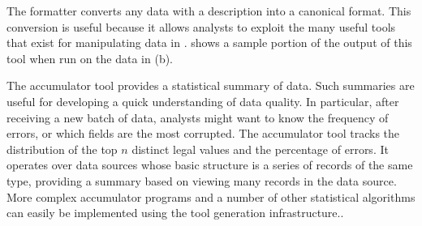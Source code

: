 The \xml{} formatter converts any data with a \padsml{} description into a canonical \xml{} format.  This conversion is useful because it allows analysts to exploit the many useful tools that exist for manipulating data in \xml{}.   shows a sample portion of the output of this tool when run on the \dibbler{} data in (b).  

The accumulator tool provides a statistical summary of data.
Such summaries are useful for developing a quick understanding of data quality.  In particular, after receiving a new batch of data, analysts might want to know the frequency of errors, or which fields are the most corrupted. 
The accumulator tool tracks the distribution of the top $n$
distinct legal values and the percentage of errors. 
It operates over data sources
whose basic structure is a series of records of the same type, 
providing a summary based on viewing many records
in the data source.    More complex accumulator programs and a number of other statistical algorithms can easily be implemented using the tool generation infrastructure..






	  
